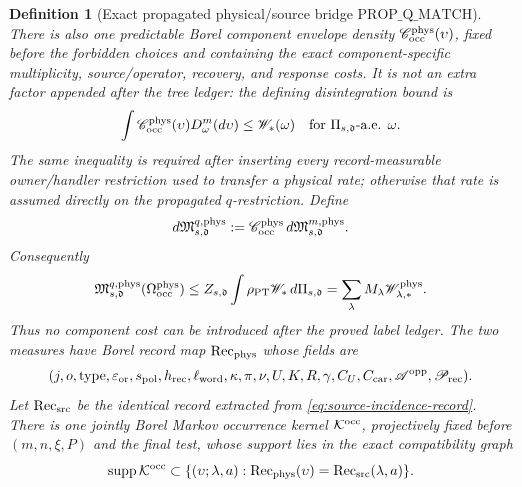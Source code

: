 \documentclass[11pt]{article}
\newtheorem{definition}[theorem]{Definition}
\begin{document}
\begin{definition}[Exact propagated physical/source bridge
$\mathrm{PROP\_Q\_MATCH}$]
There is also one predictable Borel component envelope density
$\mathscr C_{\rm occ}^{\rm phys}(\upsilon)$, fixed before the forbidden
choices and containing the exact component-specific multiplicity,
source/operator, recovery, and response costs.  It is not an extra factor
appended after the tree ledger: the defining disintegration bound is
\begin{equation}
\label{eq:physical-occurrence-envelope-disintegration}
 \int\mathscr C_{\rm occ}^{\rm phys}(\upsilon)
       D_\omega^m(d\upsilon)\le\mathscr W_*(\omega)
 \quad\text{for }\Pi_{s,\mathfrak d}\text{-a.e. }\omega.
\end{equation}
The same inequality is required after inserting every record-measurable
owner/handler restriction used to transfer a physical rate; otherwise that
rate is assumed directly on the propagated $q$-restriction.  Define
\begin{equation}
\label{eq:physical-occurrence-q-measure}
 d\mathfrak M_{s,\mathfrak d}^{q,\rm phys}
 :=\mathscr C_{\rm occ}^{\rm phys}\,
   d\mathfrak M_{s,\mathfrak d}^{m,\rm phys}.
\end{equation}
Consequently
\begin{equation}
\label{eq:physical-occurrence-total-ledger}
 \mathfrak M_{s,\mathfrak d}^{q,\rm phys}
       (\Omega_{\rm occ}^{\rm phys})
 \le Z_{s,\mathfrak d}\int\rho_{\rm PT}\mathscr W_*\,d\Pi_{s,\mathfrak d}
 =\sum_\lambda M_\lambda\mathscr W_{\lambda,*}^{\rm phys}.
\end{equation}
Thus no component cost can be introduced after the proved label ledger.  The two measures have
Borel record map
$\operatorname{Rec}_{\rm phys}$ whose fields are
\begin{equation}
\label{eq:physical-occurrence-record}
 (j,o,\operatorname{type},\varepsilon_{\rm or},s_{\rm pol},h_{\rm rec},
   \ell_{\rm word},\kappa,\pi,\nu,U,K,R,\gamma,C_U,C_{\rm car},
   \mathscr A^{\rm opp},\mathscr P_{\rm rec}).
\end{equation}
Let $\operatorname{Rec}_{\rm src}$ be the identical record extracted from
\eqref{eq:source-incidence-record}.  There is one jointly Borel Markov
occurrence kernel $\mathcal K^{\rm occ}$, projectively fixed before
$(m,n,\xi,P)$ and the final test, whose support lies in the exact
compatibility graph
\begin{equation}
\label{eq:prop-q-compatibility-graph}
 \operatorname{supp}\mathcal K^{\rm occ}
 \subset\{(\upsilon;\lambda,a):
  \operatorname{Rec}_{\rm phys}(\upsilon)
   =\operatorname{Rec}_{\rm src}(\lambda,a)\}.
\end{equation}

\end{definition}
\end{document}
